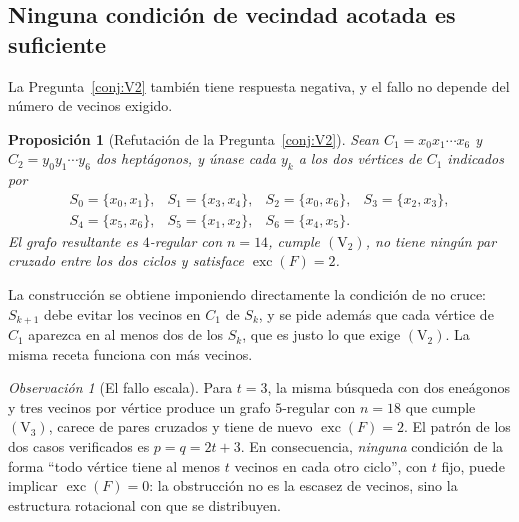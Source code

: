 \documentclass[11pt,a4paper]{article}
\newtheorem{proposicion}[teorema]{Proposición}
\theoremstyle{definition}
\theoremstyle{remark}
\newtheorem{observacion}[teorema]{Observación}
\begin{document}
\subsection{Ninguna condición de vecindad acotada es suficiente}\label{sub:Vfalla}

La Pregunta~\ref{conj:V2} también tiene respuesta negativa, y el fallo no depende del número de vecinos exigido.

\begin{proposicion}[Refutación de la Pregunta~\ref{conj:V2}]\label{prop:V2falsa}
Sean $C_1=x_0x_1\cdots x_6$ y $C_2=y_0y_1\cdots y_6$ dos heptágonos, y únase cada $y_k$ a los dos vértices de $C_1$ indicados por
\[
\begin{array}{llll}
S_0=\{x_0,x_1\}, & S_1=\{x_3,x_4\}, & S_2=\{x_0,x_6\}, & S_3=\{x_2,x_3\},\\
S_4=\{x_5,x_6\}, & S_5=\{x_1,x_2\}, & S_6=\{x_4,x_5\}. &
\end{array}
\]
El grafo resultante es $4$-regular con $n=14$, cumple $(\mathrm{V}_2)$, no tiene ningún par cruzado entre los dos ciclos y satisface $\operatorname{exc}(F)=2$.
\end{proposicion}

La construcción se obtiene imponiendo directamente la condición de no cruce: $S_{k+1}$ debe evitar los vecinos en $C_1$ de $S_k$, y se pide además que cada vértice de $C_1$ aparezca en al menos dos de los $S_k$, que es justo lo que exige $(\mathrm{V}_2)$. La misma receta funciona con más vecinos.

\begin{observacion}[El fallo escala]\label{obs:Vt}
Para $t=3$, la misma búsqueda con dos eneágonos y tres vecinos por vértice produce un grafo $5$-regular con $n=18$ que cumple $(\mathrm{V}_3)$, carece de pares cruzados y tiene de nuevo $\operatorname{exc}(F)=2$. El patrón de los dos casos verificados es $p=q=2t+3$. En consecuencia, \emph{ninguna} condición de la forma ``todo vértice tiene al menos $t$ vecinos en cada otro ciclo'', con $t$ fijo, puede implicar $\operatorname{exc}(F)=0$: la obstrucción no es la escasez de vecinos, sino la estructura rotacional con que se distribuyen.
\end{observacion}
\end{document}
